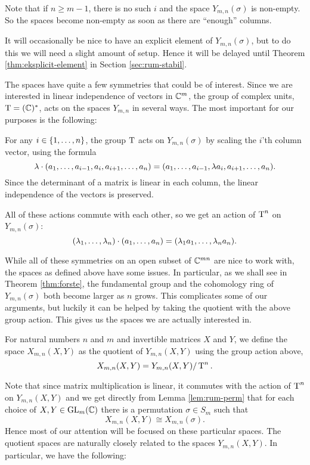 \begin{remark}
  Note that if $n \geq m-1$, there is no such $i$ and the space
  $Y_{m,n}(\sigma)$ is non-empty. So the spaces become non-empty as
  soon as there are ``enough'' columns.
\end{remark}
It will occasionally be nice to have an explicit element of
$Y_{m,n}(\sigma)$, but to do this we will need a slight amount of
setup. Hence it will be delayed until Theorem
\ref{thm:eksplicit-element} in Section \ref{sec:rum-stabil}.

The spaces have quite a few symmetries that could be of interest.
Since we are interested in linear independence of vectors in $\mathbb{C}^m$,
the group of complex units, $\operatorname{T}=(\mathbb{C})^*$, acts on the spaces $Y_{m,n}$
in several ways. The 
most important for our purposes is the following:
\begin{definition}
  For any $i \in \left\{ 1,\dots,n \right\}$, the group $\operatorname{T}$ acts
  on $Y_{m,n}(\sigma)$ by scaling the $i$'th column vector,
  using the formula
  \[ \lambda \cdot (a_1,\dots,a_{i-1},a_i,a_{i+1},\dots,a_n) =
  (a_1,\dots,a_{i-1},\lambda a_i,a_{i+1},\dots,a_n). \]
  Since the determinant of a matrix is linear in each column, the
  linear independence of the vectors is preserved.

  All of these actions commute with each other, so we get an action of
  $\operatorname{T}^n$ on $Y_{m,n}(\sigma)$:
  \[ (\lambda_1,\dots,\lambda_n) \cdot (a_1,\dots,a_n) = (\lambda_1 a_1,\dots, \lambda_n
  a_n). \]
\end{definition}

While all of these symmetries on an open subset of $\mathbb{C}^{mn}$ are nice
to work with, the spaces as defined above have some issues. In
particular, as we shall see in Theorem \ref{thm:forste}, the
fundamental group and the cohomology ring of
$Y_{m,n}(\sigma)$ both become larger as $n$ grows. This complicates
some of our arguments, but luckily it can be helped by taking the
quotient with the above group action. This gives us the spaces we are
actually interested in.

\begin{definition}
  For natural numbers $n$ and $m$ and invertible matrices $X$ and $Y$,
  we define the space $X_{m,n}(X,Y)$ as the quotient of $Y_{m,n}(X,Y)$
  using the group action above,
  \[ X_{m,n}(X,Y) = Y_{m,n}(X,Y) / \operatorname{T}^n. \]
\end{definition}

Note that since matrix multiplication is linear, it commutes with the
action of $\operatorname{T}^n$ on $Y_{m,n}(X,Y)$ and we get directly from Lemma
\ref{lem:rum-perm} that for each choice of $X,Y\in \operatorname{GL}_m(\mathbb{C})$ there is
a permutation $\sigma \in S_m$ such that
\[ X_{m,n}(X,Y) \cong X_{m,n}(\sigma). \]
Hence most of our attention will be focused on these particular
spaces. The quotient spaces are naturally closely related to the
spaces $Y_{m,n}(X,Y)$. In particular, we have the following:

